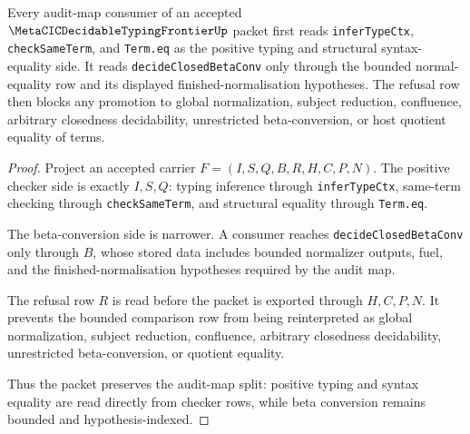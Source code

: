 \begin{theorem}
\label{thm:metacic-decidable-typing-frontier-audit-split}
Every audit-map consumer of an accepted $\MetaCICDecidableTypingFrontierUp$ packet first reads \texttt{inferTypeCtx}, \texttt{checkSameTerm}, and \texttt{Term.eq} as the positive typing and structural syntax-equality side. It reads \texttt{decideClosedBetaConv} only through the bounded normal-equality row and its displayed finished-normalisation hypotheses. The refusal row then blocks any promotion to global normalization, subject reduction, confluence, arbitrary closedness decidability, unrestricted beta-conversion, or host quotient equality of terms.
\end{theorem}
\begin{proof}
Project an accepted carrier $F=(I,S,Q,B,R,H,C,P,N)$. The positive checker side is exactly $I,S,Q$: typing inference through \texttt{inferTypeCtx}, same-term checking through \texttt{checkSameTerm}, and structural equality through \texttt{Term.eq}.

The beta-conversion side is narrower. A consumer reaches \texttt{decideClosedBetaConv} only through $B$, whose stored data includes bounded normalizer outputs, fuel, and the finished-normalisation hypotheses required by the audit map.

The refusal row $R$ is read before the packet is exported through $H,C,P,N$. It prevents the bounded comparison row from being reinterpreted as global normalization, subject reduction, confluence, arbitrary closedness decidability, unrestricted beta-conversion, or quotient equality.

Thus the packet preserves the audit-map split: positive typing and syntax equality are read directly from checker rows, while beta conversion remains bounded and hypothesis-indexed.
\end{proof}

